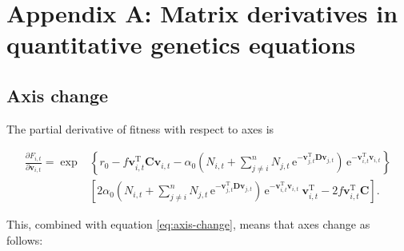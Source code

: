 
\renewcommand{\thefigure}{A\arabic{figure}}
\renewcommand{\theequation}{A\arabic{equation}}
\renewcommand{\thetable}{A\arabic{table}}
\setcounter{equation}{0}
\setcounter{figure}{0}
\setcounter{table}{0}


\section*{Appendix A: Matrix derivatives in quantitative genetics equations}




\subsection*{Axis change}

The partial derivative of fitness with respect to axes is

\begin{equation*}
\begin{split}
    \frac{ \partial F_{i,t} }{ \partial \mathbf{v}_{i,t} } =
        \exp & \left\{
            r_0
            - f \mathbf{v}_{i,t}^{\textrm{T}} \mathbf{C} \mathbf{v}_{i,t}
            - \alpha_0  \left(
                N_{i,t} + \sum_{j \ne i}^{n}{ N_{j,t} \, \textrm{e}^{
                - \mathbf{v}_{j,t}^{\textrm{T}}
                \mathbf{D} \mathbf{v}_{j,t} } }
            \right) \,
                \textrm{e}^{- \mathbf{v}_{i,t}^{\textrm{T}} \mathbf{v}_{i,t}}
        \right\} \\
        & \left[
            2 \alpha_0 \left(
                N_{i,t} + \sum_{j \ne i}^{n}{ N_{j,t} \, \textrm{e}^{
                - \mathbf{v}_{j,t}^{\textrm{T}}
                \mathbf{D} \mathbf{v}_{j,t} } }
            \right) \,
                \textrm{e}^{- \mathbf{v}_{i,t}^{\textrm{T}} \mathbf{v}_{i,t}} \:
                \mathbf{v}_{i,t}^{\textrm{T}}
            - 2 f \mathbf{v}_{i,t}^{\textrm{T}} \mathbf{C}
        \right]
    \textrm{.}
\end{split}
\end{equation*}


This, combined with equation \ref{eq:axis-change}, means that axes change as follows:

